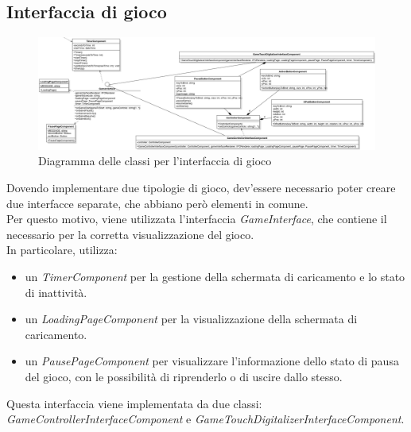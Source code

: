\subsection{Interfaccia di gioco}
\begin{figure}[h]
    \centering
    \includegraphics[width=340pt]{ProgettazioneTecnica/GameInterface.png}
    \caption{Diagramma delle classi per l'interfaccia di gioco}
    \label{fig:gameinterface}
\end{figure}
Dovendo implementare due tipologie di gioco, dev'essere necessario poter creare due interfacce separate, che abbiano però elementi in comune.\\
Per questo motivo, viene utilizzata l'interfaccia \emph{GameInterface}, che contiene il necessario per la corretta visualizzazione del gioco.\\
In particolare, utilizza:
\begin{itemize}
    \item un \emph{TimerComponent} per la gestione della schermata di caricamento e lo stato di inattività.
    \item un \emph{LoadingPageComponent} per la visualizzazione della schermata di caricamento.
    \item un \emph{PausePageComponent} per visualizzare l'informazione dello stato di pausa del gioco, con le possibilità di riprenderlo o di uscire dallo stesso.
\end{itemize}
Questa interfaccia viene implementata da due classi: \emph{GameControllerInterfaceComponent} e \emph{GameTouchDigitalizerInterfaceComponent}.
\newpage

